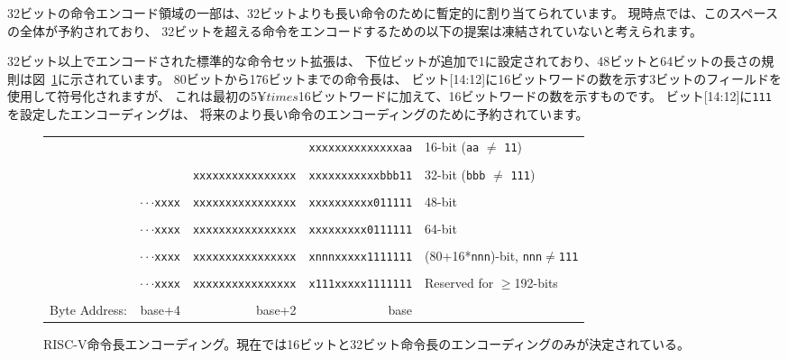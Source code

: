 32ビットの命令エンコード領域の一部は、32ビットよりも長い命令のために暫定的に割り当てられています。
現時点では、このスペースの全体が予約されており、
32ビットを超える命令をエンコードするための以下の提案は凍結されていないと考えられます。

32ビット以上でエンコードされた標準的な命令セット拡張は、
下位ビットが追加で1に設定されており、48ビットと64ビットの長さの規則は図~\ref{instlengthcode}に示されています。 
80ビットから176ビットまでの命令長は、
ビット[14:12]に16ビットワードの数を示す3ビットのフィールドを使用して符号化されますが、
これは最初の5$¥times$16ビットワードに加えて、16ビットワードの数を示すものです。
ビット[14:12]に{\tt 111}を設定したエンコーディングは、
将来のより長い命令のエンコーディングのために予約されています。

\begin{figure}[hbt]
{
\begin{center}
\begin{tabular}{ccccl}
\cline{4-4}
& & & \multicolumn{1}{|c|}{\tt xxxxxxxxxxxxxxaa} & 16-bit ({\tt aa}
$\neq$ {\tt 11})\\
\cline{4-4}
\\
\cline{3-4}
& & \multicolumn{1}{|c|}{\tt xxxxxxxxxxxxxxxx}
& \multicolumn{1}{c|}{\tt xxxxxxxxxxxbbb11} & 32-bit ({\tt bbb}
$\neq$ {\tt 111}) \\
\cline{3-4}
\\
\cline{2-4}
\hspace{0.1in}
& \multicolumn{1}{c|}{$\cdot\cdot\cdot${\tt xxxx} }
& \multicolumn{1}{c|}{\tt xxxxxxxxxxxxxxxx}
& \multicolumn{1}{c|}{\tt xxxxxxxxxx011111} & 48-bit \\
\cline{2-4}
\\
\cline{2-4}
\hspace{0.1in}
& \multicolumn{1}{c|}{$\cdot\cdot\cdot${\tt xxxx} }
& \multicolumn{1}{c|}{\tt xxxxxxxxxxxxxxxx}
& \multicolumn{1}{c|}{\tt xxxxxxxxx0111111} & 64-bit \\
\cline{2-4}
\\
\cline{2-4}
\hspace{0.1in}
& \multicolumn{1}{c|}{$\cdot\cdot\cdot${\tt xxxx} }
& \multicolumn{1}{c|}{\tt xxxxxxxxxxxxxxxx}
& \multicolumn{1}{c|}{\tt xnnnxxxxx1111111} & (80+16*{\tt nnn})-bit,
       {\tt nnn}$\neq${\tt 111} \\
\cline{2-4}
\\
\cline{2-4}
\hspace{0.1in}
& \multicolumn{1}{c|}{$\cdot\cdot\cdot${\tt xxxx} }
& \multicolumn{1}{c|}{\tt xxxxxxxxxxxxxxxx}
& \multicolumn{1}{c|}{\tt x111xxxxx1111111} & Reserved for $\geq$192-bits \\
\cline{2-4}
\\
Byte Address: & \multicolumn{1}{r}{base+4} & \multicolumn{1}{r}{base+2} & \multicolumn{1}{r}{base} & \\
 \end{tabular}
\end{center}
}
\caption{RISC-V命令長エンコーディング。現在では16ビットと32ビット命令長のエンコーディングのみが決定されている。}
\label{instlengthcode}
\end{figure}


